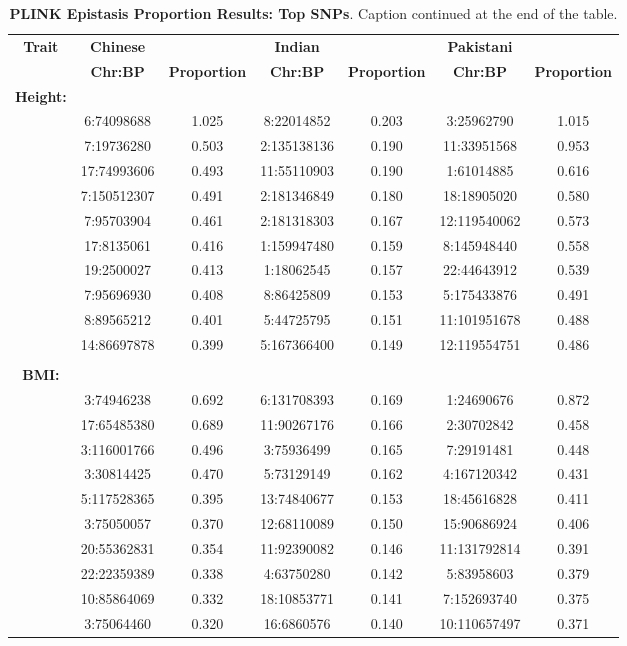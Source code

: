 \documentclass[12pt, a4paper]{article}
\begin{document}
\clearpage
\setlength{\footskip}{1cm}
\addtocounter{table}{-1}

\begin{landscape}
\setlength{\footskip}{2cm}
\begin{table}[ht]
\centering
\begin{tabular}{ccccccc}
  \hline
  \textbf{Trait} & \textbf{Chinese} & & \textbf{Indian} & & \textbf{Pakistani} & \\ 
& \textbf{Chr:BP} & \textbf{Proportion} & \textbf{Chr:BP} & \textbf{Proportion} & \textbf{Chr:BP} & \textbf{Proportion} \\ 
  \hline
\textbf{Height:} & & & & & & \\
& 6:74098688 & 1.025 & 8:22014852 & 0.203 & 3:25962790 & 1.015 \\
  & 7:19736280 & 0.503 & 2:135138136 & 0.190 & 11:33951568 & 0.953 \\ 
  & 17:74993606 & 0.493 & 11:55110903 & 0.190 & 1:61014885 & 0.616 \\ 
  & 7:150512307 & 0.491 & 2:181346849 & 0.180 & 18:18905020 & 0.580 \\ 
  & 7:95703904 & 0.461 & 2:181318303 & 0.167 & 12:119540062 & 0.573 \\ 
  & 17:8135061 & 0.416 & 1:159947480 & 0.159 & 8:145948440 & 0.558 \\ 
  & 19:2500027 & 0.413 & 1:18062545 & 0.157 & 22:44643912 & 0.539 \\ 
  & 7:95696930 & 0.408 & 8:86425809 & 0.153 & 5:175433876 & 0.491 \\ 
  & 8:89565212 & 0.401 & 5:44725795 & 0.151 & 11:101951678 & 0.488 \\ 
  & 14:86697878 & 0.399 & 5:167366400 & 0.149 & 12:119554751 & 0.486 \\
  \\
\textbf{BMI:} & & & & & & \\
& 3:74946238 & 0.692 & 6:131708393 & 0.169 & 1:24690676 & 0.872 \\ 
  & 17:65485380 & 0.689 & 11:90267176 & 0.166 & 2:30702842 & 0.458 \\ 
  & 3:116001766 & 0.496 & 3:75936499 & 0.165 & 7:29191481 & 0.448 \\ 
  & 3:30814425 & 0.470 & 5:73129149 & 0.162 & 4:167120342 & 0.431 \\ 
  & 5:117528365 & 0.395 & 13:74840677 & 0.153 & 18:45616828 & 0.411 \\ 
  & 3:75050057 & 0.370 & 12:68110089 & 0.150 & 15:90686924 & 0.406 \\ 
  & 20:55362831 & 0.354 & 11:92390082 & 0.146 & 11:131792814 & 0.391 \\ 
  & 22:22359389 & 0.338 & 4:63750280 & 0.142 & 5:83958603 & 0.379 \\ 
  & 10:85864069 & 0.332 & 18:10853771 & 0.141 & 7:152693740 & 0.375 \\ 
  & 3:75064460 & 0.320 & 16:6860576 & 0.140 & 10:110657497 & 0.371 \\ 
   \hline
\end{tabular}
\caption[TBD]{\textbf{PLINK Epistasis Proportion Results: Top SNPs}. Caption continued at the end of the table.}
\label{InterPath-Supp-Table-PLINK-Proportions-TopSNPs-b}
\end{table}
\end{landscape}
\end{document}
